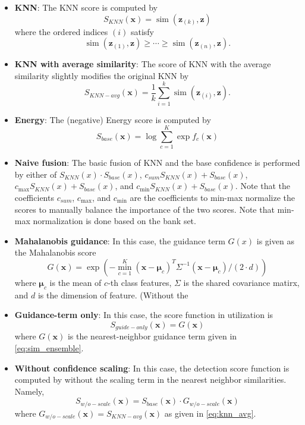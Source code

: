 \documentclass[10pt,twocolumn,letterpaper]{article}
\DeclareMathOperator{\simop}{sim}
\begin{document}
\begin{itemize}
\item 
\textbf{KNN}: The KNN score is computed by
\begin{equation}
S_{KNN}(\mathbf{x}) = \simop ( \mathbf{z}_{(k)}, \mathbf{z})
\end{equation}
where the ordered indices $(i)$ satisfy
\begin{equation}
\simop ( \mathbf{z}_{(1)}, \mathbf{z}) \geq \cdots \geq  \simop ( \mathbf{z}_{(n)}, \mathbf{z}).
\end{equation}
\item
\textbf{KNN with average similarity}: The score of KNN with the average similarity slightly modifies the original KNN by
\begin{equation}
\label{eq:knn_avg}
S_{KNN-avg}(\mathbf{x}) = \frac{1}{k} \sum_{i=1}^k \simop ( \mathbf{z}_{(i)}, \mathbf{z}).
\end{equation}
\item
\textbf{Energy}: The (negative) Energy score is computed by
\begin{equation}
S_{base}(\mathbf{x}) = \log \sum_{c=1}^K \exp f_c(\mathbf{x})
\end{equation}
\item
\textbf{Naive fusion}: The basic fusion of KNN and the base confidence is performed by either of $S_{KNN}(x) \cdot S_{base}(x)$, $c_{sum} S_{KNN}(x) + S_{base}(x)$, $c_{\max} S_{KNN}(x) + S_{base}(x)$, and $c_{\min} S_{KNN}(x) + S_{base}(x)$. Note that the coefficients $c_{sum}$, $c_{\max}$, and $c_{\min}$ are the coefficients to min-max normalize the scores to manually balance the importance of the two scores. Note that min-max normalization is done based on the bank set.
\item
\textbf{Mahalanobis guidance}: 
In this case, the guidance term $G(x)$ is given as the Mahalanobis score
\begin{equation}
G(\mathbf{x}) = \exp(- \min_{c=1}^K (\mathbf{x} - \boldsymbol{\mu}_c)^T\Sigma^{-1}(\mathbf{x} - \boldsymbol{\mu}_c)/(2\cdot d))
\end{equation}
where $\boldsymbol{\mu}_c$ is the mean of $c$-th class features, $\Sigma$ is the shared covariance matirx, and $d$ is the dimension of feature. (Without the 
\item
\textbf{Guidance-term only}: In this case, the score function in utilization is 
\begin{equation}
S_{guide-only}(\mathbf{x}) = G(\mathbf{x})
\end{equation}
where $G(\mathbf{x})$ is the nearest-neighbor guidance term given in \eqref{eq:sim_ensemble}.
\item
\textbf{Without confidence scaling}: In this case, the detection score function is computed by without the scaling term in the nearest neighbor similarities. Namely,
\begin{equation}
S_{w/o-scale}(\mathbf{x}) = S_{base}(\mathbf{x}) \cdot G_{w/o-scale}(\mathbf{x})
\end{equation}
where $G_{w/o-scale}(\mathbf{x}) = S_{KNN-avg}(\mathbf{x})$ as given in \eqref{eq:knn_avg}.
\end{itemize}
\end{document}
